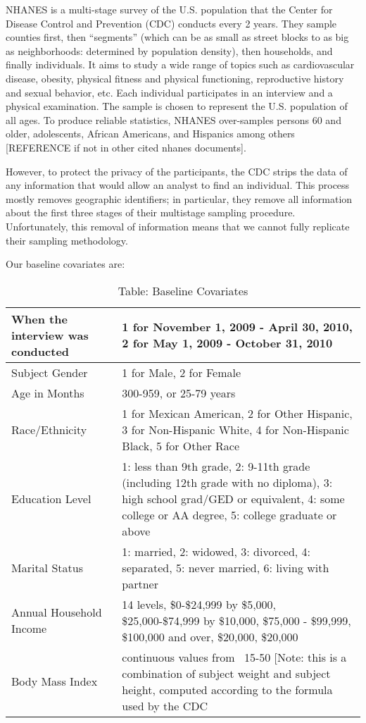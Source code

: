 \documentclass{article}
\begin{document}
NHANES is a multi-stage survey of the U.S. population that the Center for Disease Control and Prevention (CDC) conducts every 2 years.  They sample counties first, then ``segments'' (which can be as small as street blocks to as big as neighborhoods: determined by population density), then households, and finally individuals.  It aims to study a wide range of topics such as cardiovascular disease, obesity, physical fitness and physical functioning, reproductive history and sexual behavior, etc.  Each individual participates in an interview and a physical examination.  The sample is chosen to represent the U.S. population of all ages.  To produce reliable statistics, NHANES over-samples persons 60 and older, adolescents, African Americans, and Hispanics among others [REFERENCE if not in other cited nhanes documents].  

However, to protect the privacy of the participants, the CDC strips the data of any information that would allow an analyst to find an individual.  This process mostly removes geographic identifiers; in particular, they remove all information about the first three stages of their multistage sampling procedure.  Unfortunately, this removal of information means that we cannot fully replicate their sampling methodology.

Our baseline covariates are:
\vspace{0.5cm}

\begin{table}
\caption{Table: Baseline Covariates}
\begin{tabular}{| p{3cm} | p{7cm} |}
\hline
When the interview was conducted & 1 for November 1, 2009 - April 30, 2010, 2 for May 1, 2009 - October 31, 2010\\
\hline
Subject Gender & 1 for Male, 2 for Female\\
\hline
Age in Months & 300-959, or 25-79 years\\
\hline
Race/Ethnicity & 1 for Mexican American, 2 for Other Hispanic, 3 for Non-Hispanic White, 4 for Non-Hispanic Black, 5 for Other Race\\
\hline
Education Level & 1: less than 9th grade, 2: 9-11th grade (including 12th grade with no diploma), 3: high school grad/GED or equivalent, 4: some college or AA degree, 5: college graduate or above\\
\hline
Marital Status & 1: married, 2: widowed, 3: divorced, 4: separated, 5: never married, 6: living with partner\\
\hline
Annual Household Income & 14 levels, \$0-\$24,999 by \$5,000, \$25,000-\$74,999 by \$10,000,  \$75,000 - \$99,999, \$100,000 and over, \$20,000, \$20,000\\
\hline
Body Mass Index & continuous values from ~15-50 [Note: this is a combination of subject weight and subject height, computed according to the formula used by the CDC \cite{bmi}\\
\hline
\end{tabular}
\end{table}
\end{document}
